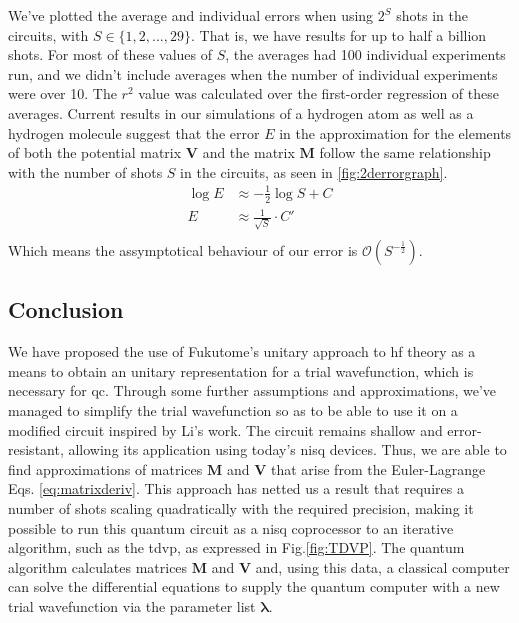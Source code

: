 \documentclass{aux/ttuthes2007}
\begin{document}
We've plotted the average and individual errors when using $2^S$ shots in the circuits, with $S \in \{1, 2, \ldots, 29\}$. That is, we have results for up to half a billion shots. For most of these values of $S$, the averages had 100 individual experiments run, and we didn't include averages when the number of individual experiments were over 10. The $r^2$ value was calculated over the first-order regression of these averages.
Current results in our simulations of a hydrogen atom as well as a hydrogen molecule suggest that the error $E$ in the approximation for the elements of both the potential matrix $\bm V$ and the matrix $\bm M$ follow the same relationship with the number of shots $S$ in the circuits, as seen in \ref{fig:2derrorgraph}. 
%
\begin{equation*}
	\begin{split}
		\log E &\approx -\frac 1 2 \log S + C \\
		E &\approx \frac 1 {\sqrt{S}} \cdot C' \\
	\end{split}
\end{equation*}
%
Which means the assymptotical behaviour of our error is $\mathcal O(S^{-\frac 1 2})$.

\subsection{\textbf{Conclusion}}

We have proposed the use of Fukutome's  unitary approach to \gls{hf} theory as a means to obtain an unitary representation for a trial wavefunction, which is necessary for \gls{qc}.
Through some further assumptions and approximations, we've managed to simplify the trial wavefunction so as to be able to use it on a modified circuit inspired by Li's  work. The circuit remains shallow and error-resistant, allowing its application using today's \gls{nisq} devices.
Thus, we are able to find approximations of matrices $\bm M$ and $\bm V$ that arise from the Euler-Lagrange Eqs. \ref{eq:matrixderiv}.
This approach has netted us a result that requires a number of shots scaling quadratically with the required precision, making it possible to run this quantum circuit as a \gls{nisq} coprocessor to an iterative algorithm, such as the \gls{tdvp}, as expressed in Fig.\ref{fig:TDVP}.
The quantum algorithm calculates matrices $\bm M$ and $\bm V$ and, using this data, a classical computer can solve the differential equations to supply the quantum computer with a new trial wavefunction via the parameter list $\bm \lambda$.
\end{document}
